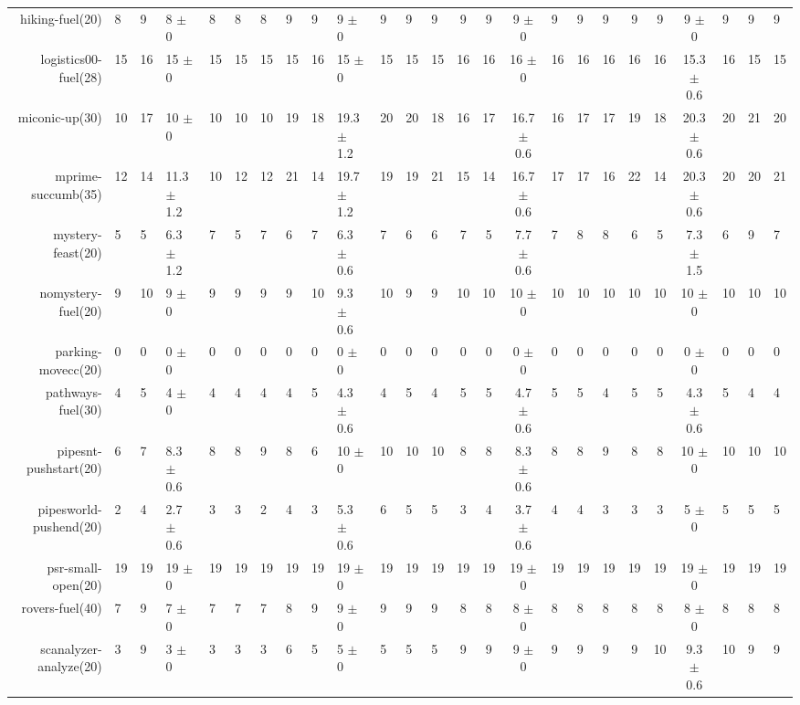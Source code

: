 \begin{center}
\begin{tabular}{|rHHHHHHHHHHHHcccHHH|cccHHH|}
hiking-fuel(20) & 8 & 9 & 8 $\pm$ 0 & 8 & 8 & 8 & 9 & 9 & 9 $\pm$ 0 & 9 & 9 & 9 & 9 & 9 & 9 $\pm$ 0 & 9 & 9 & 9 & 9 & 9 & 9 $\pm$ 0 & 9 & 9 & 9\\
logistics00-fuel(28) & 15 & 16 & 15 $\pm$ 0 & 15 & 15 & 15 & 15 & 16 & 15 $\pm$ 0 & 15 & 15 & 15 & 16 & 16 & 16 $\pm$ 0 & 16 & 16 & 16 & 16 & 16 & 15.3 $\pm$ 0.6 & 16 & 15 & 15\\
miconic-up(30) & 10 & 17 & 10 $\pm$ 0 & 10 & 10 & 10 & 19 & 18 & 19.3 $\pm$ 1.2 & 20 & 20 & 18 & 16 & 17 & 16.7 $\pm$ 0.6 & 16 & 17 & 17 & 19 & 18 & 20.3 $\pm$ 0.6 & 20 & 21 & 20\\
mprime-succumb(35) & 12 & 14 & 11.3 $\pm$ 1.2 & 10 & 12 & 12 & 21 & 14 & 19.7 $\pm$ 1.2 & 19 & 19 & 21 & 15 & 14 & 16.7 $\pm$ 0.6 & 17 & 17 & 16 & 22 & 14 & 20.3 $\pm$ 0.6 & 20 & 20 & 21\\
mystery-feast(20) & 5 & 5 & 6.3 $\pm$ 1.2 & 7 & 5 & 7 & 6 & 7 & 6.3 $\pm$ 0.6 & 7 & 6 & 6 & 7 & 5 & 7.7 $\pm$ 0.6 & 7 & 8 & 8 & 6 & 5 & 7.3 $\pm$ 1.5 & 6 & 9 & 7\\
nomystery-fuel(20) & 9 & 10 & 9 $\pm$ 0 & 9 & 9 & 9 & 9 & 10 & 9.3 $\pm$ 0.6 & 10 & 9 & 9 & 10 & 10 & 10 $\pm$ 0 & 10 & 10 & 10 & 10 & 10 & 10 $\pm$ 0 & 10 & 10 & 10\\
parking-movecc(20) & 0 & 0 & 0 $\pm$ 0 & 0 & 0 & 0 & 0 & 0 & 0 $\pm$ 0 & 0 & 0 & 0 & 0 & 0 & 0 $\pm$ 0 & 0 & 0 & 0 & 0 & 0 & 0 $\pm$ 0 & 0 & 0 & 0\\
pathways-fuel(30) & 4 & 5 & 4 $\pm$ 0 & 4 & 4 & 4 & 4 & 5 & 4.3 $\pm$ 0.6 & 4 & 5 & 4 & 5 & 5 & 4.7 $\pm$ 0.6 & 5 & 5 & 4 & 5 & 5 & 4.3 $\pm$ 0.6 & 5 & 4 & 4\\
pipesnt-pushstart(20) & 6 & 7 & 8.3 $\pm$ 0.6 & 8 & 8 & 9 & 8 & 6 & 10 $\pm$ 0 & 10 & 10 & 10 & 8 & 8 & 8.3 $\pm$ 0.6 & 8 & 8 & 9 & 8 & 8 & 10 $\pm$ 0 & 10 & 10 & 10\\
pipesworld-pushend(20) & 2 & 4 & 2.7 $\pm$ 0.6 & 3 & 3 & 2 & 4 & 3 & 5.3 $\pm$ 0.6 & 6 & 5 & 5 & 3 & 4 & 3.7 $\pm$ 0.6 & 4 & 4 & 3 & 3 & 3 & 5 $\pm$ 0 & 5 & 5 & 5\\
psr-small-open(20) & 19 & 19 & 19 $\pm$ 0 & 19 & 19 & 19 & 19 & 19 & 19 $\pm$ 0 & 19 & 19 & 19 & 19 & 19 & 19 $\pm$ 0 & 19 & 19 & 19 & 19 & 19 & 19 $\pm$ 0 & 19 & 19 & 19\\
rovers-fuel(40) & 7 & 9 & 7 $\pm$ 0 & 7 & 7 & 7 & 8 & 9 & 9 $\pm$ 0 & 9 & 9 & 9 & 8 & 8 & 8 $\pm$ 0 & 8 & 8 & 8 & 8 & 8 & 8 $\pm$ 0 & 8 & 8 & 8\\
scanalyzer-analyze(20) & 3 & 9 & 3 $\pm$ 0 & 3 & 3 & 3 & 6 & 5 & 5 $\pm$ 0 & 5 & 5 & 5 & 9 & 9 & 9 $\pm$ 0 & 9 & 9 & 9 & 9 & 10 & 9.3 $\pm$ 0.6 & 10 & 9 & 9\\

\end{tabular}
\end{center}
